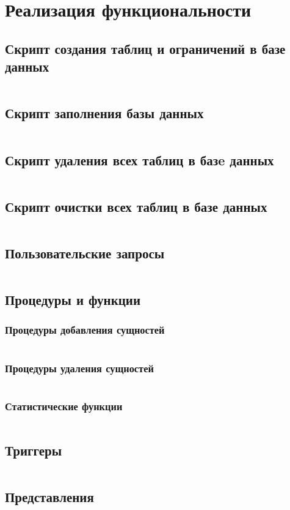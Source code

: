 \documentclass[12 pt, a4paper]{article}
\begin{document}
\section{Реализация функциональности}
\subsection{Скрипт создания таблиц и ограничений в базе данных}
\inputminted{sql}{../scripts/create_db.sql}
\subsection{Скрипт заполнения базы данных}
\inputminted{sql}{../scripts/fill_db.sql}
\subsection{Скрипт удаления всех таблиц в базe данных}
\inputminted{sql}{../scripts/drop_db.sql}
\subsection{Скрипт очистки всех таблиц в базе данных}
\inputminted{sql}{../scripts/clear_db.sql}
\subsection{Пользовательские запросы}
\inputminted{sql}{../scripts/user_queries.sql}
\subsection{Процедуры и функции}
\subsubsection{Процедуры добавления сущностей}
\inputminted{sql}{../scripts/add_procedures.sql}
\subsubsection{Процедуры удаления сущностей}
\inputminted{sql}{../scripts/delete_procedures.sql}
\subsubsection{Статистические функции}
\inputminted{sql}{../scripts/statistic_functions.sql}
\subsection{Триггеры}
\inputminted{sql}{../scripts/triggers.sql}
\subsection{Представления}
\inputminted{sql}{../scripts/views.sql}
\end{document}
